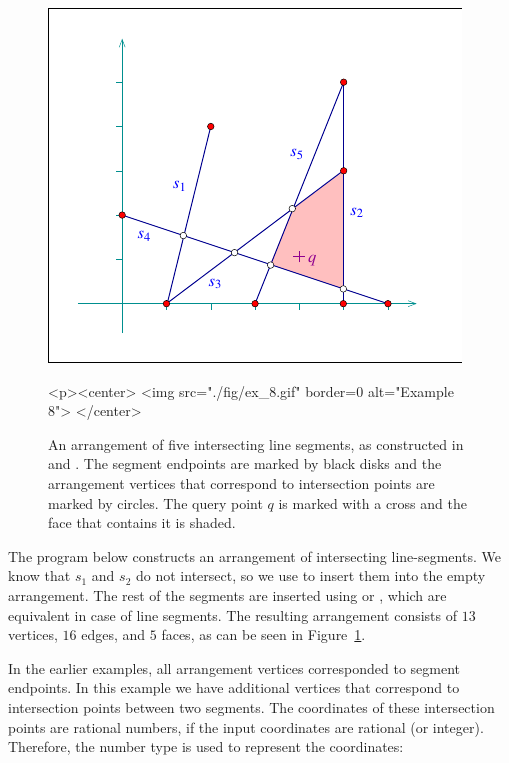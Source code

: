 \begin{figure}[t]
\begin{ccTexOnly}
  \begin{center}
  \includegraphics{Arrangement_2/fig/ex_8}
  \end{center}
\end{ccTexOnly}
\begin{ccHtmlOnly}
  <p><center>
  <img src="./fig/ex_8.gif" border=0 alt="Example 8">
  </center>
\end{ccHtmlOnly}
\caption{An arrangement of five intersecting line segments, as
constructed in  and
. The segment
endpoints are marked by black disks and the arrangement vertices
that correspond to intersection points are marked by circles.
The query point $q$ is marked with a cross and the face that
contains it is shaded.}
\label{arr_fig:ex_8}
\end{figure}

The program below constructs an arrangement of intersecting
line-segments. We know that $s_1$ and $s_2$ do not intersect, so
we use  to insert them into the
empty arrangement. The rest of the segments are inserted using
 or , which are
equivalent in case of line segments. The resulting arrangement consists
of $13$ vertices, $16$ edges, and $5$ faces, as can be seen in
Figure~\ref{arr_fig:ex_8}.

In the earlier examples, all arrangement vertices corresponded to
segment endpoints. In this example we have additional vertices that
correspond to intersection points between two segments. The
coordinates of these intersection points are rational numbers, if
the input coordinates are rational (or integer). Therefore,
the  number type is used to represent the
coordinates:

